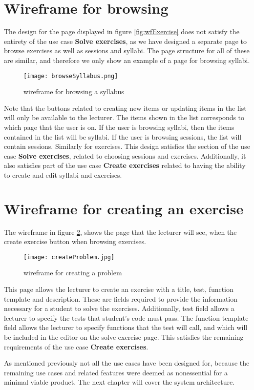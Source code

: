 \section{Wireframe for browsing}
The design for the page displayed in figure \ref{fig:wfExercise} does not satisfy the entirety of the use case \textbf{Solve exercises}, as we have designed a separate page to browse exercises as well as sessions and syllabi. The page structure for all of these are similar, and therefore we only show an example of a page for browsing syllabi.
\begin{figure}[H]
    \texttt{[image: browseSyllabus.png]}
    \centering
    \caption{wireframe for browsing a syllabus}
    \label{fig:wfSyllabus}
\end{figure}
Note that the buttons related to creating new items or updating items in the list will only be available to the lecturer. The items shown in the list corresponds to which page that the user is on. If the user is browsing syllabi, then the items contained in the list will be syllabi. If the user is browsing sessions, the list will contain sessions. Similarly for exercises. This design satisfies the section of the use case \textbf{Solve exercises}, related to choosing sessions and exercises. Additionally, it also satisfies part of the use case \textbf{Create exercises} related to having the ability to create and edit syllabi and exercises.

\section{Wireframe for creating an exercise}
The wireframe in figure \ref{fig:wfProblem}, shows the page that the lecturer will see, when the create exercise button when browsing exercises. 
\begin{figure}[H]
	\texttt{[image: createProblem.jpg]}
	\centering
	\caption{wireframe for creating a problem}
	\label{fig:wfProblem}
\end{figure}

This page allows the lecturer to create an exercise with a title, test, function template and description. These are fields required to provide the information necessary for a student to solve the exercises. Additionally, test field allows a lecturer to specify the tests that student's code must pass. The function template field allows the lecturer to specify functions that the test will call, and which will be included in the editor on the solve exercise page. This satisfies the remaining requirements of the use case \textbf{Create exercises}.

As mentioned previously not all the use cases have been designed for, because the remaining use cases and related features were deemed as nonessential for a minimal viable product. The next chapter will cover the system architecture.
